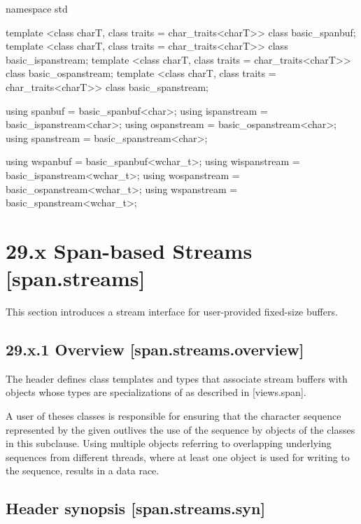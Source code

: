\documentclass[ebook,11pt,article]{memoir}
\begin{document}
\begin{codeblock}
namespace std {
  template <class charT, class traits = char_traits<charT>>
    class basic_spanbuf;
  template <class charT, class traits = char_traits<charT>>
    class basic_ispanstream;
  template <class charT, class traits = char_traits<charT>>
    class basic_ospanstream;
  template <class charT, class traits = char_traits<charT>>
    class basic_spanstream;

  using spanbuf     = basic_spanbuf<char>;
  using ispanstream = basic_ispanstream<char>;
  using ospanstream = basic_ospanstream<char>;
  using spanstream  = basic_spanstream<char>;

  using wspanbuf     = basic_spanbuf<wchar_t>;
  using wispanstream = basic_ispanstream<wchar_t>;
  using wospanstream = basic_ospanstream<wchar_t>;
  using wspanstream  = basic_spanstream<wchar_t>;
}
\end{codeblock}



\section{29.x Span-based Streams [span.streams]}

\pnum
This section introduces a stream interface for user-provided fixed-size buffers. 
\subsection{29.x.1 Overview [span.streams.overview]}

\pnum
The header  defines class templates and types that associate stream buffers with objects whose types are specializations of  as described in [views.span]. 

\begin{note}
A user of theses classes is responsible for ensuring that the character sequence represented by the given  outlives the use of the sequence by objects of the classes in this subclause. Using multiple  objects referring to overlapping underlying sequences from different threads, where at least one  object is used for writing to the sequence, results in a data race.
\end{note}

\subsection{Header  synopsis [span.streams.syn]}
\end{document}
